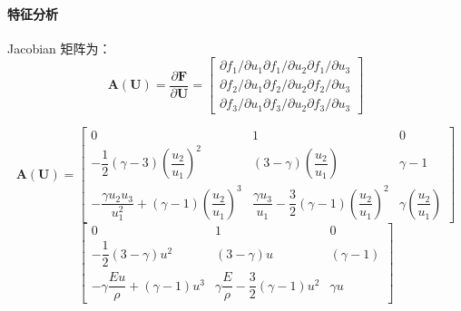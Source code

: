 \documentclass{book}
\begin{document}
\paragraph{特征分析}
Jacobian 矩阵为：
\begin{equation}
    \mathbf{A}(\mathbf{U})=\dfrac{\partial \mathbf{F}}{\partial \mathbf{U}}=\left[\begin{array}{l}
            \partial f_{1} / \partial u_{1} \partial f_{1} / \partial u_{2} \partial f_{1} / \partial u_{3} \\
            \partial f_{2} / \partial u_{1} \partial f_{2} / \partial u_{2} \partial f_{2} / \partial u_{3} \\
            \partial f_{3} / \partial u_{1} \partial f_{3} / \partial u_{2} \partial f_{3} / \partial u_{3}
        \end{array}\right]
\end{equation}

\begin{equation}
    \mathbf{A}(\mathbf{U})=\begin{bmatrix}
        0                                                                                      & 1                                                                                       & 0                                       \\
        -\dfrac{1}{2}(\gamma-3)\left(\dfrac{u_{2}}{u_{1}}\right)^{2}                           & (3-\gamma)\left(\dfrac{u_{2}}{u_{1}}\right)                                             & \gamma-1                                \\
        -\dfrac{\gamma u_{2} u_{3}}{u_{1}^{2}}+(\gamma-1)\left(\dfrac{u_{2}}{u_{1}}\right)^{3} & \dfrac{\gamma u_{3}}{u_{1}}-\dfrac{3}{2}(\gamma-1)\left(\dfrac{u_{2}}{u_{1}}\right)^{2} & \gamma\left(\dfrac{u_{2}}{u_{1}}\right)
    \end{bmatrix}
\end{equation}
\begin{equation}
    \begin{bmatrix}
        0                                          & 1                                                   & 0          \\
        -\dfrac{1}{2}(3-\gamma) u^{2}              & (3-\gamma) u                                        & (\gamma-1) \\
        -\gamma \dfrac{E u}{\rho}+(\gamma-1) u^{3} & \gamma \dfrac{E}{\rho}-\dfrac{3}{2}(\gamma-1) u^{2} & \gamma u
    \end{bmatrix}
\end{equation}
\end{document}
